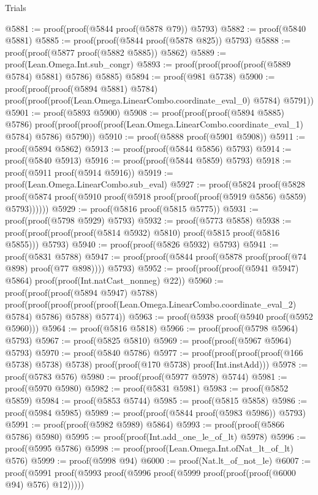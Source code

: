 \begin{lexlean}{Trials}
\begin{coremodule}
@5881 := proof(proof(@5844 proof(@5878 @79)) @5793)
@5882 := proof(@5840 @5881)
@5885 := proof(proof(@5844 proof(@5878 @825)) @5793)
@5888 := proof(proof(@5877 proof(@5882 @5885)) @5862)
@5889 := proof(Lean.Omega.Int.sub_congr)
@5893 := proof(proof(proof(proof(@5889 @5784) @5881) @5786) @5885)
@5894 := proof(@981 @5738)
@5900 := proof(proof(proof(@5894 @5881) @5784)
      proof(proof(proof(Lean.Omega.LinearCombo.coordinate_eval_0) @5784) @5791))
@5901 := proof(@5893 @5900)
@5908 := proof(proof(proof(@5894 @5885) @5786)
      proof(proof(proof(proof(Lean.Omega.LinearCombo.coordinate_eval_1) @5784) @5786) @5790))
@5910 := proof(@5888 proof(@5901 @5908))
@5911 := proof(@5894 @5862)
@5913 := proof(proof(@5844 @5856) @5793)
@5914 := proof(@5840 @5913)
@5916 := proof(proof(@5844 @5859) @5793)
@5918 := proof(@5911 proof(@5914 @5916))
@5919 := proof(Lean.Omega.LinearCombo.sub_eval)
@5927 := proof(@5824
      proof(@5828
          proof(@5874 proof(@5910 proof(@5918 proof(proof(proof(@5919 @5856) @5859) @5793))))))
@5929 := proof(@5816 proof(@5815 @5775))
@5931 := proof(proof(@5798 @5929) @5793)
@5932 := proof(@5773 @5858)
@5938 := proof(proof(proof(proof(@5814 @5932) @5810) proof(@5815 proof(@5816 @5855))) @5793)
@5940 := proof(proof(@5826 @5932) @5793)
@5941 := proof(@5831 @5788)
@5947 := proof(proof(@5844 proof(@5878 proof(proof(@74 @898) proof(@77 @898)))) @5793)
@5952 := proof(proof(proof(@5941 @5947) @5864) proof(proof(Int.natCast_nonneg) @22))
@5960 := proof(proof(proof(@5894 @5947) @5788)
      proof(proof(proof(proof(proof(Lean.Omega.LinearCombo.coordinate_eval_2) @5784) @5786) @5788)
          @5774))
@5963 := proof(@5938 proof(@5940 proof(@5952 @5960)))
@5964 := proof(@5816 @5818)
@5966 := proof(proof(@5798 @5964) @5793)
@5967 := proof(@5825 @5810)
@5969 := proof(proof(@5967 @5964) @5793)
@5970 := proof(@5840 @5786)
@5977 := proof(proof(proof(proof(@166 @5738) @5738) @5738)
      proof(proof(@170 @5738) proof(Int.instAdd)))
@5978 := proof(@5783 @576)
@5980 := proof(proof(@5977 @5978) @5744)
@5981 := proof(@5970 @5980)
@5982 := proof(@5831 @5981)
@5983 := proof(@5852 @5859)
@5984 := proof(@5853 @5744)
@5985 := proof(@5815 @5858)
@5986 := proof(@5984 @5985)
@5989 := proof(proof(@5844 proof(@5983 @5986)) @5793)
@5991 := proof(proof(@5982 @5989) @5864)
@5993 := proof(proof(@5866 @5786) @5980)
@5995 := proof(proof(Int.add_one_le_of_lt) @5978)
@5996 := proof(@5995 @5786)
@5998 := proof(proof(Lean.Omega.Int.ofNat_lt_of_lt) @576)
@5999 := proof(@5998 @94)
@6000 := proof(Nat.lt_of_not_le)
@6007 := proof(@5991 proof(@5993 proof(@5996 proof(@5999 proof(proof(proof(@6000 @94) @576) @12)))))

\end{coremodule}
\end{lexlean}
